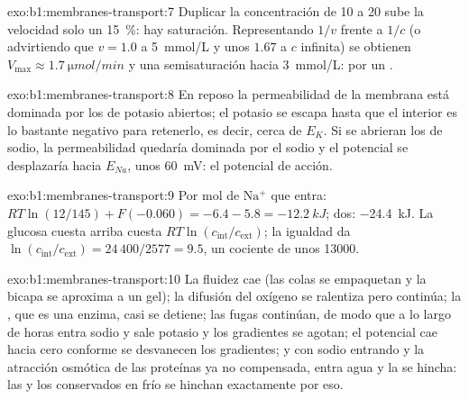 \begin{solution}{exo:b1:membranes-transport:7}
Duplicar la concentración de 10 a 20 sube la velocidad solo un
\qty{15}{\%}: hay saturación. Representando $1/v$ frente a $1/c$ (o
advirtiendo que $v = 1.0$ a \qty{5}{mmol/L} y unos $1.67$ a $c$ infinita) se
obtienen $V_{\max} \approx \qty{1.7}{\micro mol/min}$ y una semisaturación
hacia \qty{3}{mmol/L}:  por un .
\end{solution}

\begin{solution}{exo:b1:membranes-transport:8}
En reposo la permeabilidad de la membrana está dominada por los  de
potasio abiertos; el potasio se escapa hasta que el interior es lo bastante
negativo para retenerlo, es decir, cerca de $E_K$. Si se abrieran los
 de sodio, la permeabilidad quedaría dominada por el sodio y el
potencial se desplazaría hacia $E_{Na}$, unos \qty{+60}{mV}: el potencial de
acción.
\end{solution}

\begin{solution}{exo:b1:membranes-transport:9}
Por mol de $\mathrm{Na^+}$ que entra: $RT\ln(12/145) + F(-0.060) = -6.4 - 5.8
= \qty{-12.2}{kJ}$; dos: \qty{-24.4}{kJ}. La glucosa cuesta arriba cuesta
$RT\ln(c_{\text{int}}/c_{\text{ext}})$; la igualdad da
$\ln(c_{\text{int}}/c_{\text{ext}}) = 24\,400/2577 = 9.5$, un cociente de
unos \num{13000}.
\end{solution}

\begin{solution}{exo:b1:membranes-transport:10}
La fluidez cae (las colas se empaquetan y la bicapa se aproxima a un gel);
la difusión del oxígeno se ralentiza pero continúa; la , que es una
enzima, casi se detiene; las fugas continúan, de modo que a lo largo de
horas entra sodio y sale potasio y los gradientes se agotan; el potencial
cae hacia cero conforme se desvanecen los gradientes; y con sodio entrando y
la atracción osmótica de las proteínas ya no compensada, entra agua y la
 se hincha: las  y los  conservados en frío se hinchan
exactamente por eso.
\end{solution}

